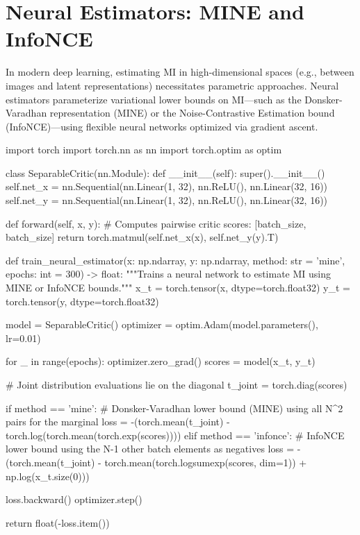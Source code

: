 \section{Neural Estimators: MINE and InfoNCE}

In modern deep learning, estimating MI in high-dimensional spaces (e.g., between images and latent representations) necessitates parametric approaches. Neural estimators parameterize variational lower bounds on MI—such as the Donsker-Varadhan representation (MINE) or the Noise-Contrastive Estimation bound (InfoNCE)—using flexible neural networks optimized via gradient ascent.

\begin{pycode}
import torch
import torch.nn as nn
import torch.optim as optim

class SeparableCritic(nn.Module):
    def __init__(self):
        super().__init__()
        self.net_x = nn.Sequential(nn.Linear(1, 32), nn.ReLU(), nn.Linear(32, 16))
        self.net_y = nn.Sequential(nn.Linear(1, 32), nn.ReLU(), nn.Linear(32, 16))
        
    def forward(self, x, y):
        # Computes pairwise critic scores: [batch_size, batch_size]
        return torch.matmul(self.net_x(x), self.net_y(y).T)

def train_neural_estimator(x: np.ndarray, y: np.ndarray, method: str = 'mine', epochs: int = 300) -> float:
    """Trains a neural network to estimate MI using MINE or InfoNCE bounds."""
    x_t = torch.tensor(x, dtype=torch.float32)
    y_t = torch.tensor(y, dtype=torch.float32)
    
    model = SeparableCritic()
    optimizer = optim.Adam(model.parameters(), lr=0.01)
    
    for _ in range(epochs):
        optimizer.zero_grad()
        scores = model(x_t, y_t)
        
        # Joint distribution evaluations lie on the diagonal
        t_joint = torch.diag(scores)
        
        if method == 'mine':
            # Donsker-Varadhan lower bound (MINE) using all N^2 pairs for the marginal
            loss = -(torch.mean(t_joint) - torch.log(torch.mean(torch.exp(scores))))
        elif method == 'infonce':
            # InfoNCE lower bound using the N-1 other batch elements as negatives
            loss = -(torch.mean(t_joint) - torch.mean(torch.logsumexp(scores, dim=1)) + np.log(x_t.size(0)))
            
        loss.backward()
        optimizer.step()
        
    return float(-loss.item())
\end{pycode}

